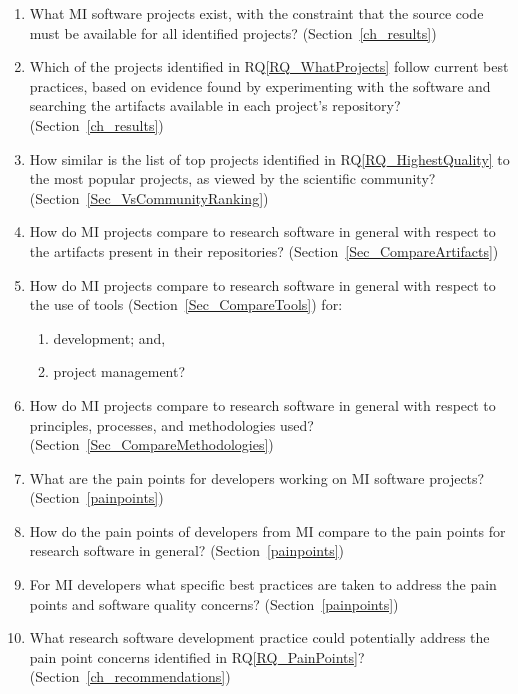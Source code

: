 \documentclass[11pt]{article}
\newcounter{rqnum} %
\newcommand{\rqref}[1]{RQ\ref{#1}}
\newcounter{qnum} %
\begin{document}
\begin{enumerate}
	\item[RQ\refstepcounter{rqnum}\therqnum \label{RQ_WhatProjects}:] What MI
	software projects exist, with the constraint that the source code must be
	available for all identified projects? (Section~\ref{ch_results})
	\item [RQ\refstepcounter{rqnum}\therqnum \label{RQ_HighestQuality}:] Which
	of the projects identified in \rqref{RQ_WhatProjects} follow current best
	practices, based on evidence found by experimenting with the software and
	searching the artifacts available in each project's repository?
	(Section~\ref{ch_results})
	\item [RQ\refstepcounter{rqnum}\therqnum \label{RQ_CompareHQ2Popular}:] How
	similar is the list of top projects identified in \rqref{RQ_HighestQuality}
	to the most popular projects, as viewed by the scientific community?
	(Section~\ref{Sec_VsCommunityRanking})
    \item [RQ\refstepcounter{rqnum}\therqnum \label{RQ_CompareArtifacts}:] How
	do MI projects compare to research software in general with respect to the
	artifacts present in their repositories?
	(Section~\ref{Sec_CompareArtifacts})
	\item [RQ\refstepcounter{rqnum}\therqnum \label{RQ_CompareToolsProjMngmnt}:]
	How do MI projects compare to research software in general with respect to
	the use of tools (Section~\ref{Sec_CompareTools}) for:
	\begin{enumerate} 
		\item [\rqref{RQ_CompareToolsProjMngmnt}.a] development; and,
		\item [\rqref{RQ_CompareToolsProjMngmnt}.b] project management?
	\end{enumerate}
	\item [RQ\refstepcounter{rqnum}\therqnum \label{RQ_CompareMethodologies}:]
	How do MI projects compare to research software in general with respect to
	principles, processes, and methodologies used?
	(Section~\ref{Sec_CompareMethodologies})
	\item [RQ\refstepcounter{rqnum}\therqnum \label{RQ_PainPoints}:] What are
	the pain points for developers working on MI software projects?
	(Section~\ref{painpoints})
	\item [RQ\refstepcounter{rqnum}\therqnum \label{RQ_ComparePainPoints}:] How
	do the pain points of developers from MI compare to the pain points
	for research software in general? (Section~\ref{painpoints})
	\item [RQ\refstepcounter{rqnum}\therqnum \label{RQ_Concerns}:] For MI
	developers what specific best practices are taken to address the pain points
	and software quality concerns? (Section~\ref{painpoints})
	\item [RQ\refstepcounter{rqnum}\therqnum \label{RQ_Recommend}:]
	What research software development practice could potentially address the
	pain point concerns identified in \rqref{RQ_PainPoints}?
	(Section~\ref{ch_recommendations})

\end{enumerate}
\end{document}
